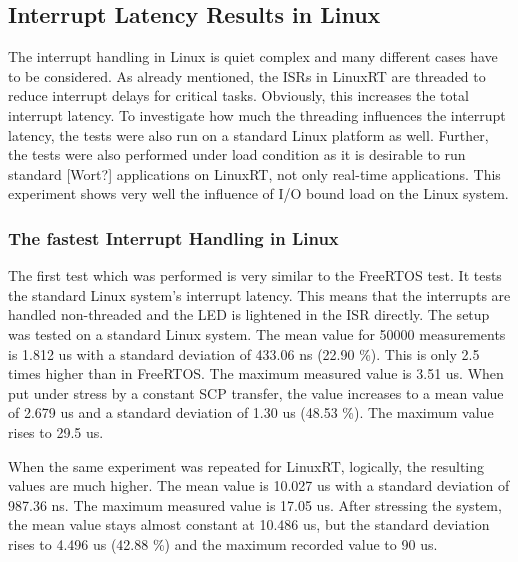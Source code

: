 \subsection{Interrupt Latency Results in Linux}\label{ss_interrupt_latency_results_in_linux}
The interrupt handling in Linux is quiet complex and many different cases have to be considered. 
As already mentioned, the \acp{ISR} in LinuxRT are threaded to reduce interrupt delays for critical tasks. 
Obviously, this increases the total interrupt latency.
To investigate how much the threading influences the interrupt latency, the tests were also run on a standard Linux platform as well.
Further, the tests were also performed under load condition as it is desirable to run standard [Wort?] applications on LinuxRT, not only real-time applications. 
This experiment shows very well the influence of \ac{I/O} bound load on the Linux system.

\subsubsection{The fastest Interrupt Handling in Linux}
The first test which was performed is very similar to the FreeRTOS test. 
It tests the standard Linux system's interrupt latency.
This means that the interrupts are handled non-threaded and the \ac{LED} is lightened in the \ac{ISR} directly.
The setup was tested on a standard Linux system.
The mean value for 50000 measurements is 1.812 us with a standard deviation of 433.06 ns (22.90 \%). 
This is only 2.5 times higher than in FreeRTOS. 
The maximum measured value is 3.51 us.
When put under stress by a constant SCP transfer, the value increases to a mean value of 2.679 us and a standard deviation of 1.30 us (48.53 \%).
The maximum value rises to 29.5 us.
\par
When the same experiment was repeated for LinuxRT, logically, the resulting values are much higher.
The mean value is 10.027 us with a standard deviation of 987.36 ns. 
The maximum measured value is 17.05 us.
After stressing the system, the mean value stays almost constant at 10.486 us, but the standard deviation rises to 4.496 us (42.88 \%) and the maximum recorded value to 90 us.

